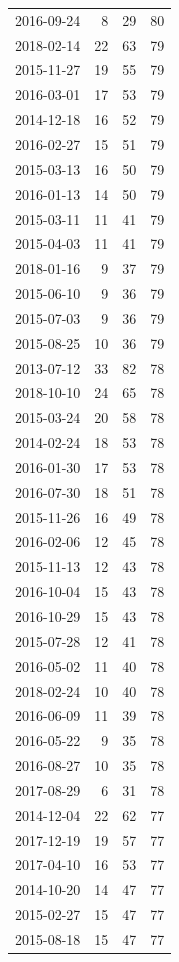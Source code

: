 \begin{tabular}{lrrr}
2016-09-24 & 8 & 29 & 80 \\
2018-02-14 & 22 & 63 & 79 \\
2015-11-27 & 19 & 55 & 79 \\
2016-03-01 & 17 & 53 & 79 \\
2014-12-18 & 16 & 52 & 79 \\
2016-02-27 & 15 & 51 & 79 \\
2015-03-13 & 16 & 50 & 79 \\
2016-01-13 & 14 & 50 & 79 \\
2015-03-11 & 11 & 41 & 79 \\
2015-04-03 & 11 & 41 & 79 \\
2018-01-16 & 9 & 37 & 79 \\
2015-06-10 & 9 & 36 & 79 \\
2015-07-03 & 9 & 36 & 79 \\
2015-08-25 & 10 & 36 & 79 \\
2013-07-12 & 33 & 82 & 78 \\
2018-10-10 & 24 & 65 & 78 \\
2015-03-24 & 20 & 58 & 78 \\
2014-02-24 & 18 & 53 & 78 \\
2016-01-30 & 17 & 53 & 78 \\
2016-07-30 & 18 & 51 & 78 \\
2015-11-26 & 16 & 49 & 78 \\
2016-02-06 & 12 & 45 & 78 \\
2015-11-13 & 12 & 43 & 78 \\
2016-10-04 & 15 & 43 & 78 \\
2016-10-29 & 15 & 43 & 78 \\
2015-07-28 & 12 & 41 & 78 \\
2016-05-02 & 11 & 40 & 78 \\
2018-02-24 & 10 & 40 & 78 \\
2016-06-09 & 11 & 39 & 78 \\
2016-05-22 & 9 & 35 & 78 \\
2016-08-27 & 10 & 35 & 78 \\
2017-08-29 & 6 & 31 & 78 \\
2014-12-04 & 22 & 62 & 77 \\
2017-12-19 & 19 & 57 & 77 \\
2017-04-10 & 16 & 53 & 77 \\
2014-10-20 & 14 & 47 & 77 \\
2015-02-27 & 15 & 47 & 77 \\
2015-08-18 & 15 & 47 & 77 \\

\end{tabular}
